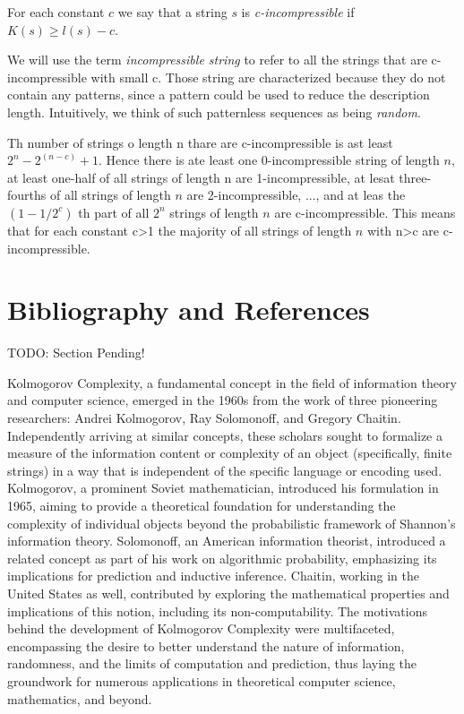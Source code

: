 \begin{definition}
For each constant $c$ we say that a string $s$ is \emph{c-incompressible} if $K(s)\geq l(s)-c$.
\end{definition}

We will use the term \emph{incompressible string} to refer to all the strings that are c-incompressible with small c. Those string are characterized because they do not contain any patterns, since a pattern could be used to reduce the description length. Intuitively, we think of such patternless sequences as being \emph{random}.

Th number of strings o length n thare are c-incompressible is ast least $2^n - 2^(n-c) + 1$. Hence there is ate least one 0-incompressible string of length $n$, at least one-half of all strings of length n are 1-incompressible, at lesat three-fourths of all strings of length $n$ are 2-incompressible, ..., and at leas the $(1-1/2^c)$ th part of all $2^n$ strings of length $n$ are c-incompressible. This means that for each constant c>1 the majority of all strings of length $n$ with n>c are c-incompressible.


%
%

\section*{Bibliography and References}

{\color{red} TODO: Section Pending!}

{\color{red} Kolmogorov Complexity, a fundamental concept in the field of information theory and computer science, emerged in the 1960s from the work of three pioneering researchers: Andrei Kolmogorov, Ray Solomonoff, and Gregory Chaitin. Independently arriving at similar concepts, these scholars sought to formalize a measure of the information content or complexity of an object (specifically, finite strings) in a way that is independent of the specific language or encoding used. Kolmogorov, a prominent Soviet mathematician, introduced his formulation in 1965, aiming to provide a theoretical foundation for understanding the complexity of individual objects beyond the probabilistic framework of Shannon's information theory. Solomonoff, an American information theorist, introduced a related concept as part of his work on algorithmic probability, emphasizing its implications for prediction and inductive inference. Chaitin, working in the United States as well, contributed by exploring the mathematical properties and implications of this notion, including its non-computability. The motivations behind the development of Kolmogorov Complexity were multifaceted, encompassing the desire to better understand the nature of information, randomness, and the limits of computation and prediction, thus laying the groundwork for numerous applications in theoretical computer science, mathematics, and beyond. }


